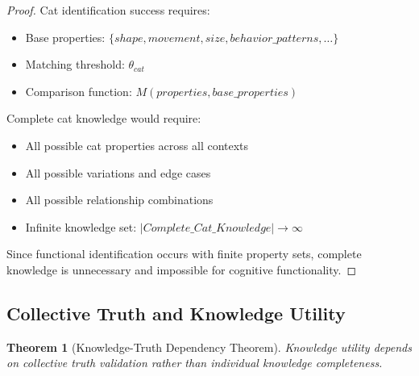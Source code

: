 \documentclass[12pt,a4paper]{article}
\newtheorem{theorem}{Theorem}[section]
\begin{document}
\begin{proof}
Cat identification success requires:
\begin{itemize}
\item Base properties: $\{shape, movement, size, behavior\_patterns, \ldots\}$
\item Matching threshold: $\theta_{cat}$
\item Comparison function: $M(properties, base\_properties)$
\end{itemize}

Complete cat knowledge would require:
\begin{itemize}
\item All possible cat properties across all contexts
\item All possible variations and edge cases
\item All possible relationship combinations
\item Infinite knowledge set: $|Complete\_Cat\_Knowledge| \rightarrow \infty$
\end{itemize}

Since functional identification occurs with finite property sets, complete knowledge is unnecessary and impossible for cognitive functionality.
\end{proof}

\subsection{Collective Truth and Knowledge Utility}

\begin{theorem}[Knowledge-Truth Dependency Theorem]
Knowledge utility depends on collective truth validation rather than individual knowledge completeness.
\end{theorem}
\end{document}
